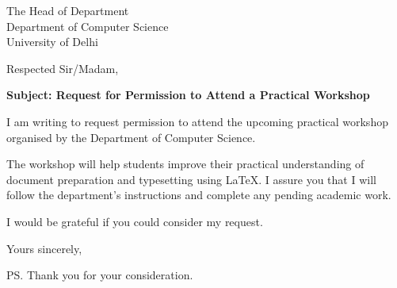 \documentclass[12pt,a4paper]{letter}
\date{\today}
\begin{document}
\begin{letter}{The Head of Department\\
Department of Computer Science\\
University of Delhi}

\opening{Respected Sir/Madam,}

\textbf{Subject: Request for Permission to Attend a Practical Workshop}

I am writing to request permission to attend the upcoming practical
workshop organised by the Department of Computer Science.

The workshop will help students improve their practical understanding
of document preparation and typesetting using LaTeX. I assure you that
I will follow the department's instructions and complete any pending
academic work.

I would be grateful if you could consider my request.

\closing{Yours sincerely,}

\ps{Thank you for your consideration.}

\end{letter}
\end{document}
